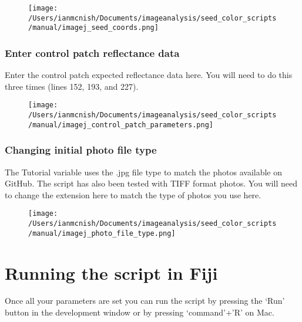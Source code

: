 \documentclass[12pt]{article}
\begin{document}
\begin{figure}[H]
	\centering
	\texttt{[image: /Users/ianmcnish/Documents/imageanalysis/seed\_color\_scripts/manual/imagej\_seed\_coords.png]}
	\label{fig:imagej_change_file_directory}
\end{figure}

\subsubsection{Enter control patch reflectance data}\label{sec:control_patch_reflectance}

\noindent Enter the control patch expected reflectance data here. You will need to do this three times (lines 152, 193, and 227).\\

\begin{figure}[H]
	\centering
	\texttt{[image: /Users/ianmcnish/Documents/imageanalysis/seed\_color\_scripts/manual/imagej\_control\_patch\_parameters.png]}
	\label{fig:imagej_control_patch_parameters}
\end{figure}

\subsubsection{Changing initial photo file type}\label{sec:file_type}

\noindent The Tutorial variable uses the .jpg file type to match the photos available on GitHub. The script has also been tested with TIFF format photos. You will need to change the extension here to match the type of photos you use here.\\

\begin{figure}[H]
	\centering
	\texttt{[image: /Users/ianmcnish/Documents/imageanalysis/seed\_color\_scripts/manual/imagej\_photo\_file\_type.png]}
	\label{fig:imagej_photo_file_type}
\end{figure}

\section{Running the script in Fiji}\label{sec:run_imagej_script}

\noindent Once all your parameters are set you can run the script by pressing the `Run' button in the development window or by pressing `command'+'R' on Mac.\\
\end{document}

